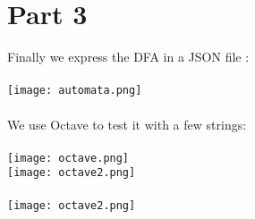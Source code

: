 \documentclass{article}
\begin{document}
\section*{Part 3}
Finally we express the DFA in a JSON file : \\\\ \texttt{[image: automata.png]} \\\\ We use Octave to test it with a few strings: \\\\ \texttt{[image: octave.png]} \\ \texttt{[image: octave2.png]} \\\\ \texttt{[image: octave2.png]}
\end{document}
